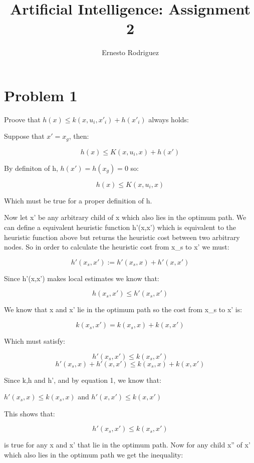 \documentclass{article}
\title{Artificial Intelligence: Assignment 2}
\author{Ernesto Rodriguez}
\begin{document}
\maketitle

\section{Problem 1}

Proove that $h(x) \leq k(x,u_i,x'_i)+h(x'_i)$ always holds:

Suppose that $x'=x_g$, then:

\begin{equation} h(x) \leq K(x,u_i,x) + h(x') \end{equation}

By definiton of h, $h(x')=h(x_g)=0$ so:

\[ h(x) \leq K(x,u_i,x) \]

Which must be true for a proper definition of h.

Now let x' be any arbitrary child of x which also lies in the optimum path. We can define a equivalent heuristic function h'(x,x') which is equivalent to the heuristic function above but returns the heuristic cost between two arbitrary nodes. So in order to calculate the heuristic cost from x_s to x' we must:

\[h'(x_s,x'):=h'(x_s,x)+h'(x,x') \]

Since h'(x,x') makes local estimates we know that:

\[h(x_s,x') \leq h'(x_s,x')\]

We know that x and x' lie in the optimum path so the cost from x_s to x' is:

\[ k(x_s,x')=k(x_s,x)+k(x,x') \]

Which must satisfy:

\[ h'(x_s,x') \leq k(x_s,x') \]
\[ h'(x_s,x)+h'(x,x') \leq k(x_s,x)+k(x,x') \]

Since k,h and h', and by equation 1, we know that:

$h'(x_s,x) \leq k(x_s,x)$ and $h'(x,x') \leq k(x,x')$

This shows that: 

\begin{equation}   
  h'(x_s,x') \leq k(x_s,x')
\end{equation}

 is true for any x and x' that lie in the optimum path. Now for any child x'' of x' which also lies in the optimum path we get the inequality:
\end{document}

